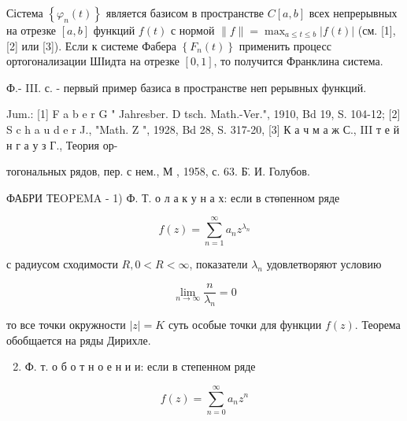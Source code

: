 \documentclass[10pt]{article}
\begin{document}
Сістема $\left\{\varphi_{n}(t)\right\}$ является базисом в пространстве $C[a, b]$ всех непрерывных на отрезке $[a, b]$ функций $f(t)$ с нормой $\|f\|=\max _{a \leqslant t \leqslant b}|f(t)|$ (см. [1], [2] или [3]). Если к системе Фабера $\left\{F_{n}(t)\right\}$ применить процесс ортогонализации ШІидта на отрезке $[0,1]$, то получится Франклина система.



Ф.- III. с. - первый пример базиса в пространстве неп рерывных функций.



Jum.: [1] F a b e r G " Jahresber. D tsch. Math.-Ver.", 1910, Bd 19, S. 104-12; [2] S c h a u d e r J., "Math. Z ", 1928, Bd 28, S. 317-20, [3] К а ч м а ж С., III т е й н г а у з Г., Теория ор-

тогональных рядов, пер. с нем., М , 1958, с. 63. Б̈. И. Голубов.



ФАБРИ ТЕOPEMA - 1) Ф. Т. о л а к у н а х: если в стөпенном ряде



\[

f(z)=\sum_{n=1}^{\infty} a_{n} z^{\lambda_{n}}

\]



с радиусом сходимости $R, 0<R<\infty$, показатели $\lambda_{n}$ удовлетворяют условию



\[

\lim _{n \rightarrow \infty} \frac{n}{\lambda_{n}}=0

\]



то все точки окружности $|z|=K$ суть особые точки для функции $f(z)$. Теорема обобщается на ряды Дирихле.



\begin{enumerate}

  \setcounter{enumi}{1}

  \item Ф. т. о б о т н о е н и и: если в степенном ряде

\end{enumerate}



\[

f(z)=\sum_{n=0}^{\infty} a_{n} z^{n}

\]
\end{document}
